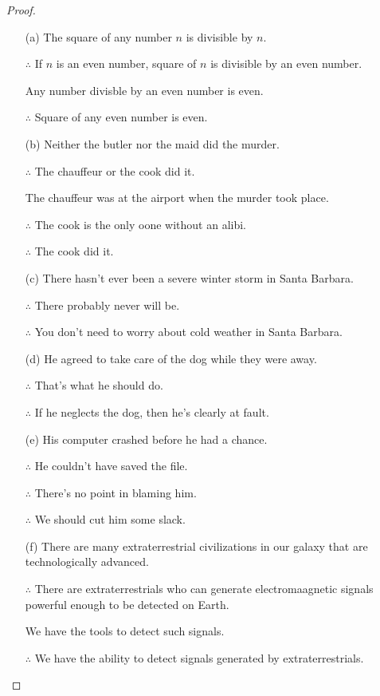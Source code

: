 \documentclass{article}
\begin{document}
\begin{proof}

    \hfil

    \begin{itemize}
        \item[(a)] The square of any number $n$ is divisible by $n$.
        
        $\therefore$ If $n$ is an even number, square of $n$ is divisible by an even number.
        
        Any number divisble by an even number is even.
        
        $\therefore$ Square of any even number is even.

        \item[(b)] Neither the butler nor the maid did the murder.
        
        $\therefore$ The chauffeur or the cook did it.

        The chauffeur was at the airport when the murder took place.

        $\therefore$ The cook is the only oone without an alibi.

        $\therefore$ The cook did it.

        \item[(c)] There hasn't ever been a severe winter storm in Santa Barbara.
        
        $\therefore$ There probably never will be.

        $\therefore$ You don't need to worry about cold weather in Santa Barbara.

        \item[(d)] He agreed to take care of the dog while they were away.
        
        $\therefore$ That's what he should do.

        $\therefore$ If he neglects the dog, then he's clearly at fault.

        \item[(e)] His computer crashed before he had a chance.
        
        $\therefore$ He couldn't have saved the file.

        $\therefore$ There's no point in blaming him.

        $\therefore$ We should cut him some slack.

        \item[(f)] There are many extraterrestrial civilizations in our galaxy that are technologically advanced.
        
        $\therefore$ There are extraterrestrials who can generate electromaagnetic signals powerful enough to be detected on Earth.

        We have the tools to detect such signals.

        $\therefore$ We have the ability to detect signals generated by extraterrestrials.
    \end{itemize}
\end{proof}
\end{document}
